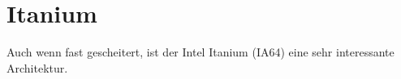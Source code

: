 \section{Itanium}
\label{itanium}

Auch wenn fast gescheitert, ist der Intel Itanium (\ac{IA64}) eine sehr interessante Architektur.

%
%
%
%
%
%
%
%
%
%
%
%
%
%
%
%
%
%
